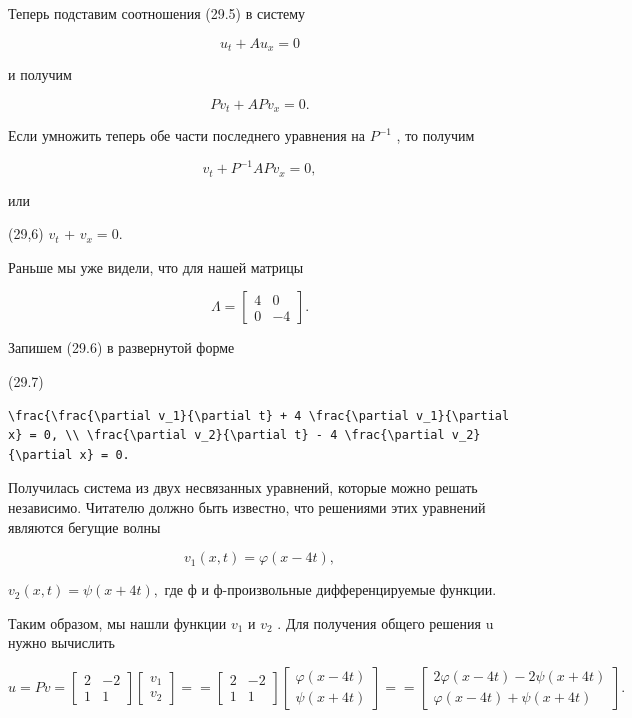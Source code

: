 \documentclass[
  ukrainian,
]{article}
\begin{document}
Теперь подставим соотношения (29.5) в систему

\[
u_t + Au_x = 0
\]

и получим

\[
Pv_t + APv_x = 0.
\]

Если умножить теперь обе части последнего уравнения на \(P^{-1}\) , то
получим

\[
v_t + P^{-1}APv_x = 0,
\]

или

(29,6) \(v_t\) +  \(v_x = 0\).

Раньше мы уже видели, что для нашей матрицы

\[
\Lambda = \begin{bmatrix} 4 & 0 \\ 0 & -4 \end{bmatrix}.
\]

Запишем (29.6) в развернутой форме

(29.7)

\begin{verbatim}
\frac{\frac{\partial v_1}{\partial t} + 4 \frac{\partial v_1}{\partial x} = 0, \\ \frac{\partial v_2}{\partial t} - 4 \frac{\partial v_2}{\partial x} = 0.
\end{verbatim}

Получилась система из двух несвязанных уравнений, которые можно решать
независимо. Читателю должно быть известно, что решениями этих уравнений
являются бегущие волны

\[
v_1(x, t) = \varphi(x-4t),
\]

\(v_2(x, t) = \psi(x+4t),\) где ф и ф-произвольные дифференцируемые
функции.

Таким образом, мы нашли функции \(v_1\) и \(v_2\) . Для получения общего
решения u нужно вычислить

\[
u = Pv = \begin{bmatrix} 2 & -2 \\ 1 & 1 \end{bmatrix} \begin{bmatrix} v_1 \\ v_2 \end{bmatrix} =
= \begin{bmatrix} 2 & -2 \\ 1 & 1 \end{bmatrix} \begin{bmatrix} \varphi(x - 4t) \\ \psi(x + 4t) \end{bmatrix} =
= \begin{bmatrix} 2\varphi(x - 4t) - 2\psi(x + 4t) \\ \varphi(x - 4t) + \psi(x + 4t) \end{bmatrix}.
\]
\end{document}
